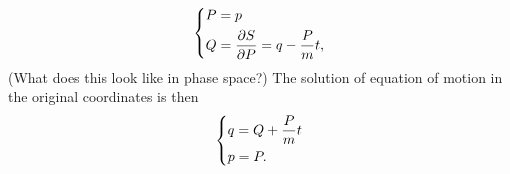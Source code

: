 \documentclass{article}
\begin{document}
    \begin{equation*}
        \begin{dcases}
            P = p \\
            Q = \pdv{S}{P} = q - \frac{P}{m}t,
        \end{dcases}
    \end{equation*}
    (What does this look like in phase space?) The solution of equation of motion in the original coordinates is then
    \begin{equation*}
    \begin{dcases*}
        q = Q + \frac{P}{m}t \\
        p = P.
    \end{dcases*}
    \end{equation*}
\end{document}
